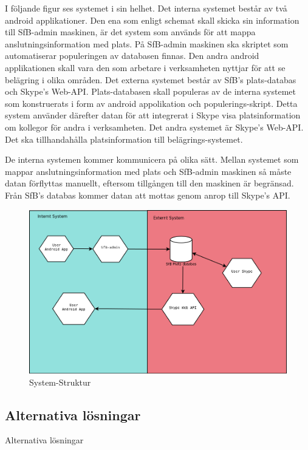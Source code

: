 \documentclass[a4paper,12pt]{article}
\begin{document}
I följande figur  %
ses systemet i sin helhet. Det interna systemet består av två android applikationer. Den ena som enligt schemat skall skicka sin information till SfB-admin maskinen, är det system som används för att mappa anslutningsinformation med plats. På SfB-admin maskinen ska skriptet som automatiserar populeringen av databasen finnas. Den andra android applikationen skall vara den som arbetare i verksamheten nyttjar för att se belägring i olika områden.
Det externa systemet består av SfB's plats-databas och Skype's Web-API. %
Plats-databasen skall populeras av de interna systemet som konstruerats i form av android appolikation och populerings-skript. Detta system använder därefter datan för att integrerat i Skype visa platsinformation om kollegor för andra i verksamheten. Det andra systemet är Skype's Web-API. Det ska tillhandahålla platsinformation till belägrings-systemet.

De interna systemen kommer kommunicera på olika sätt. Mellan systemet som mappar anslutningsinformation med plats och SfB-admin maskinen så måste datan förflyttas manuellt, eftersom tillgången till den maskinen är begränsad. Från SfB's databas kommer datan att mottas genom anrop till Skype's API. %

\begin{figure}[h]
	\includegraphics[width=15cm]{media/systemStruktur.png}
	\caption{System-Struktur}
	\label{}
\end{figure}


\subsection{Alternativa lösningar}
Alternativa lösningar
\end{document}
